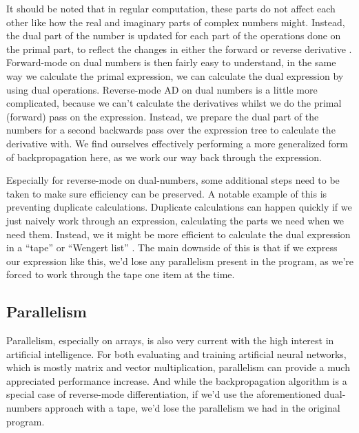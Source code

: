 \documentclass[a4paper]{article}
\begin{document}
            It should be noted that in regular computation, these parts do not affect each other like how the real and imaginary parts of complex numbers might.
            Instead, the dual part of the number is updated for each part of the operations done on the primal part, to reflect the changes in either the forward or reverse derivative \cite{krawiec2022provably,smeding2022efficient}.
            Forward-mode on dual numbers is then fairly easy to understand, in the same way we calculate the primal expression, we can calculate the dual expression by using dual operations.
            Reverse-mode AD on dual numbers is a little more complicated, because we can't calculate the derivatives whilst we do the primal (forward) pass on the expression.
            Instead, we prepare the dual part of the numbers for a second backwards pass over the expression tree to calculate the derivative with.
            We find ourselves effectively performing a more generalized form of backpropagation \cite{wang2019demystifying} here, as we work our way back through the expression.

            Especially for reverse-mode on dual-numbers, some additional steps need to be taken to make sure efficiency can be preserved.
            A notable example of this is preventing duplicate calculations.
            Duplicate calculations can happen quickly if we just naively work through an expression, calculating the parts we need when we need them.
            Instead, we it might be more efficient to calculate the dual expression in a ``tape'' or ``Wengert list'' \cite{griewank2008evaluating}.
            The main downside of this is that if we express our expression like this, we'd lose any parallelism present in the program, as we're forced to work through the tape one item at the time.

        \subsection{Parallelism}
            Parallelism, especially on arrays, is also very current with the high interest in artificial intelligence.
            For both evaluating and training artificial neural networks, which is mostly matrix and vector multiplication, parallelism can provide a much appreciated performance increase.
            And while the backpropagation algorithm is a special case of reverse-mode differentiation, if we'd use the aforementioned dual-numbers approach with a tape, we'd lose the parallelism we had in the original program.
            
\end{document}
